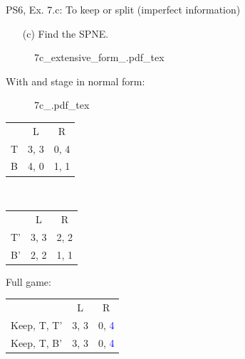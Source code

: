 \begin{frame}{PS6, Ex. 7.c: To keep or split (imperfect information)}
    \begin{itemize}
      \item[(c)] Find the SPNE.
    \end{itemize}
    \vspace{-16pt}
    \begin{figure}[!h]
      \center
      \def\svgwidth{.8\columnwidth}
      {7c_extensive_form_.pdf_tex}
    \end{figure}
    \vspace{-8pt}
    \begin{multicols}{2}
      With  and  stage in normal form:
      \vspace{-4pt}
      \begin{figure}[!h]
        \center
        \def\svgwidth{.5\columnwidth}
        {7c_.pdf_tex}
      \end{figure}
      \vspace{-9pt}
      \begin{table}
        \begin{tabular}{l|c|c|}
          \multicolumn{1}{c}{} & \multicolumn{1}{c}{L} & \multicolumn{1}{c}{R} \\\cline{2-3}
          T & 3, 3 & 0, 4 \\\cline{2-3}
          B & 4, 0 & 1, 1 \\\cline{2-3}
        \end{tabular}\
        \begin{tabular}{l|c|c|}
          \multicolumn{1}{c}{} & \multicolumn{1}{c}{L} & \multicolumn{1}{c}{R} \\\cline{2-3}
          T' & 3, 3 & 2, 2 \\\cline{2-3}
          B' & 2, 2 & 1, 1 \\\cline{2-3}
        \end{tabular}
      \end{table}
    \vfill\null \columnbreak
    Full game:
    \vspace{-16pt}
    \begin{table}
      \begin{tabular}{l|c|c|}
        \multicolumn{1}{c}{} & \multicolumn{1}{c}{L} & \multicolumn{1}{c}{R} \\\cline{2-3}
        Keep, T, T' & 3, 3 & 0, \textcolor{blue}{4} \\\cline{2-3}
        Keep, T, B' & 3, 3 & 0, \textcolor{blue}{4} \\\cline{2-3}

\end{tabular}
\end{table}
\end{multicols}
\end{frame}

